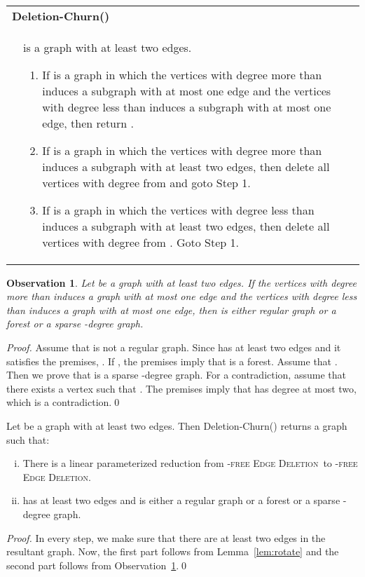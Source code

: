 \documentclass[envcountsame,envcountsect,10pt,oribibl]{llncs}
\newcommand{\pname}[1]{\textnormal{\textsc{#1}}}
\newcommand{\HED}{\pname{-free Edge Deletion}}
\newcommand{\HDED}{\pname{-free Edge Deletion}}
\newtheorem{observation}[lemma]{Observation}
\newcommand{\defstage}[2]{\hfill\\\smallskip\noindent \begin{tabularx}{\textwidth}{|l X|}\hline \multicolumn{2}{|l|}{\textbf{#1}}\\&#2\\\hline \end{tabularx}}
\begin{document}
\defstage{Deletion-Churn()}
{  is a graph with at least two edges.
  \begin{enumerate}[Step 1:]
    \item\label{item:churn-del1} If  is a graph in which the vertices with degree more than 
      induces a subgraph with at most one edge and the vertices with degree less than  induces
      a subgraph with at most one edge, then return .
    \item\label{item:churn-del2} If  is a graph in which the vertices with degree more than 
      induces a subgraph with at least two edges, then delete all vertices with degree  from  and goto Step 1.
    \item\label{item:churn-compl3} If  is a graph in which the vertices with degree less than 
      induces a subgraph with at least two edges, then delete all vertices with degree  from . Goto Step 1.
  \end{enumerate}
}

\begin{observation}
  \label{obs:deletion-churn}
  Let  be a graph with at least two edges. If the vertices with degree more than  
  induces a graph with at most one edge and the vertices with degree less than  induces
  a graph with at most one edge, then  is either regular graph or a forest or a sparse -degree graph.
\end{observation}
\begin{proof}
  Assume that  is not a regular graph.
  Since  has at least two edges and it satisfies the premises, .
  If , the premises imply that  is a forest. Assume that .
  Then we prove that  is a sparse -degree graph.
  For a contradiction, assume that there exists a vertex  such that .
  The premises imply that  has degree at most two, which is a contradiction.\qed
\end{proof}

\begin{lemma}
  \label{lem:deletion-churn}
  Let  be a graph with at least two edges. Then Deletion-Churn()
  returns a graph  such that:
  \begin{enumerate}[(i)]
  \item\label{item:deletion-churn-red} There is a linear parameterized reduction from \HDED\ to \HED.
  \item\label{item:deletion-churn-output}  has at least two edges and is either a regular graph
    or a forest or a sparse -degree graph.
  \end{enumerate}
\end{lemma}
\begin{proof}
  In every step, we make sure that there are at least two edges in the resultant graph.
  Now, the first part follows from Lemma~\ref{lem:rotate} and the second part follows
  from Observation~\ref{obs:deletion-churn}.\qed
\end{proof}
\end{document}
